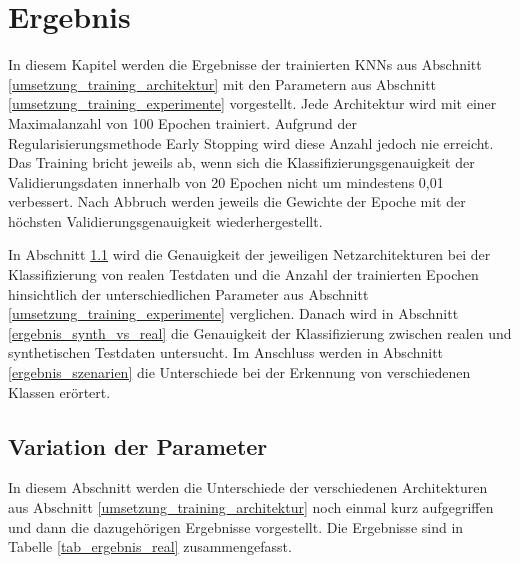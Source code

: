 

\chapter{Ergebnis}
\label{ergebnis}

In diesem Kapitel werden die Ergebnisse der trainierten \acp{KNN} aus Abschnitt \ref{umsetzung_training_architektur} mit den Parametern aus Abschnitt \ref{umsetzung_training_experimente} vorgestellt. Jede Architektur wird mit einer Maximalanzahl von 100 Epochen trainiert. Aufgrund der Regularisierungsmethode Early Stopping wird diese Anzahl jedoch nie erreicht. Das Training bricht jeweils ab, wenn sich die Klassifizierungsgenauigkeit der Validierungsdaten innerhalb von 20 Epochen nicht um mindestens 0,01 verbessert. Nach Abbruch werden jeweils die Gewichte der Epoche mit der höchsten Validierungsgenauigkeit wiederhergestellt. 

In Abschnitt \ref{ergebnis_parameter} wird die Genauigkeit der jeweiligen Netzarchitekturen bei der Klassifizierung von realen Testdaten und die Anzahl der trainierten Epochen hinsichtlich der unterschiedlichen Parameter aus Abschnitt \ref{umsetzung_training_experimente} verglichen. Danach wird in Abschnitt \ref{ergebnis_synth_vs_real} die Genauigkeit der Klassifizierung zwischen realen und synthetischen Testdaten untersucht. Im Anschluss werden in Abschnitt \ref{ergebnis_szenarien} die Unterschiede bei der Erkennung von verschiedenen Klassen erörtert.

\section{Variation der Parameter}
\label{ergebnis_parameter}

In diesem Abschnitt werden die Unterschiede der verschiedenen Architekturen aus Abschnitt \ref{umsetzung_training_architektur} noch einmal kurz aufgegriffen und dann die dazugehörigen Ergebnisse vorgestellt. Die Ergebnisse sind in Tabelle \ref{tab_ergebnis_real} zusammengefasst.


